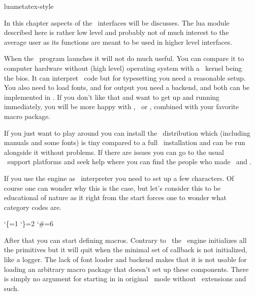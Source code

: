 
\environment luametatex-style

\startdocument[title=\LUA]

\startsection[title={Introduction}]

In this chapter aspects of the \LUA\ interfaces will be discusses. The \type
{lua} module described here is rather low level and probably not of much interest
to the average user as its functions are meant to be used in higher level
interfaces.

\stopsection

\startsection[title={Initialization}]

\startsubsection[title={A bare bone engine}]

When the \LUAMETATEX\ program launches it will not do much useful. You can
compare it to computer hardware without (high level) operating system with a
\TEX\ kernel being the bios. It can interpret \TEX\ code but for typesetting you
need a reasonable setup. You also need to load fonts, and for output you need a
backend, and both can be implemented in \LUA. If you don't like that and want to
get up and running immediately, you will be more happy with \LUATEX, \PDFTEX\ or
\XETEX, combined with your favorite macro package.

If you just want to play around you can install the \CONTEXT\ distribution which
(including manuals and some fonts) is tiny compared to a full \TEXLIVE\
installation and can be run alongside it without problems. If there are issues
you can go to the usual \CONTEXT\ support platforms and seek help where you can
find the people who made \LUATEX\ and \LUAMETATEX.

If you use the engine as \TEX\ interpreter you need to set up a few characters.
Of course one can wonder why this is the case, but let's consider this to be
educational of nature as it right from the start forces one to wonder what
category codes are.

\starttyping
\catcode`\{=1 \catcode`\}=2 \catcode`\#=6
\stoptyping

After that you can start defining macros. Contrary to \LUATEX\ the \LUAMETATEX\
engine initializes all the primitives but it will quit when the minimal set of
callback is not initialized, like a logger. The lack of font loader and backend
makes that it is not usable for loading an arbitrary macro package that doesn't
set up these components. There is simply no argument for starting in in original
\TEX\ mode without \ETEX\ extensions and such.

